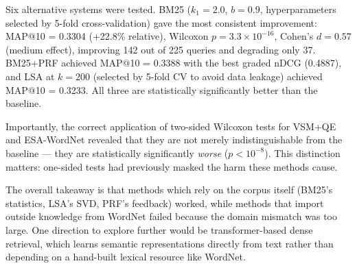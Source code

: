 \documentclass{svproc}
\begin{document}
    Six alternative systems were tested. BM25 ($k_1{=}2.0$, $b{=}0.9$, hyperparameters selected by 5-fold cross-validation) gave the most consistent improvement: MAP@10 = 0.3304 (+22.8\% relative), Wilcoxon $p = 3.3 \times 10^{-16}$, Cohen's $d = 0.57$ (medium effect), improving 142 out of 225 queries and degrading only 37. BM25+PRF achieved MAP@10 = 0.3388 with the best graded nDCG (0.4887), and LSA at $k{=}200$ (selected by 5-fold CV to avoid data leakage) achieved MAP@10 = 0.3233. All three are statistically significantly better than the baseline.

    Importantly, the correct application of two-sided Wilcoxon tests for VSM+QE and ESA-WordNet revealed that they are not merely indistinguishable from the baseline — they are statistically significantly \emph{worse} ($p < 10^{-8}$). This distinction matters: one-sided tests had previously masked the harm these methods cause.

    The overall takeaway is that methods which rely on the corpus itself (BM25's statistics, LSA's SVD, PRF's feedback) worked, while methods that import outside knowledge from WordNet failed because the domain mismatch was too large. One direction to explore further would be transformer-based dense retrieval, which learns semantic representations directly from text rather than depending on a hand-built lexical resource like WordNet.

    
\end{document}
